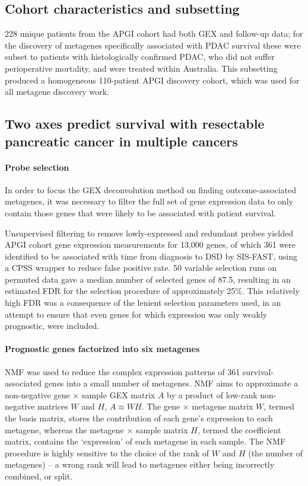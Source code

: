 \documentclass[dissertation.tex]{subfiles}
\begin{document}
\subsection{Cohort characteristics and subsetting}
228 unique patients from the \gls{APGI} cohort had both \gls{GEX} and follow-up data; for the discovery of metagenes specifically associated with \gls{PDAC} survival these were subset to patients with histologically confirmed \gls{PDAC}, who did not suffer perioperative mortality, and were treated within Australia.  This subsetting produced a homogeneous 110-patient \gls{APGI} discovery cohort, which was used for all metagene discovery work.


\subsection{Two axes predict survival with resectable pancreatic cancer in multiple cancers}
\paragraph{Probe selection}
In order to focus the \gls{GEX} deconvolution method on finding outcome-associated metagenes, it was necessary to filter the full set of gene expression data to only contain those genes that were likely to be associated with patient survival.

Unsupervised filtering to remove lowly-expressed and redundant probes yielded \gls{APGI} cohort gene expression measurements for 13,000 genes, of which 361 were identified to be associated with time from diagnosis to \gls{DSD} by \gls{SIS}-\gls{FAST}, using a \gls{CPSS} wrapper to reduce false positive rate.  50 variable selection runs on permuted data gave a median number of selected genes of 87.5, resulting in an estimated \gls{FDR} for the selection procedure of approximately 25\%.  This relatively high \gls{FDR} was a consequence of the lenient selection parameters used, in an attempt to ensure that even genes for which expression was only weakly prognostic, were included.

\paragraph{Prognostic genes factorized into six metagenes}
\gls{NMF} was used to reduce the complex expression patterns of 361 survival-associated genes into a small number of metagenes.  \gls{NMF} aims to approximate a non-negative gene $\times$ sample \gls{GEX} matrix $A$ by a product of low-rank non-negative matrices $W$ and $H$, $A \approx W H$.  The gene $\times$ metagene matrix $W$, termed the basis matrix, stores the contribution of each gene's expression to each metagene, whereas the metagene $\times$ sample matrix $H$, termed the coefficient matrix, contains the `expression' of each metagene in each sample.  The \gls{NMF} procedure is highly sensitive to the choice of the rank of $W$ and $H$ (the number of metagenes) -- a wrong rank will lead to metagenes either being incorrectly combined, or split.
\end{document}
